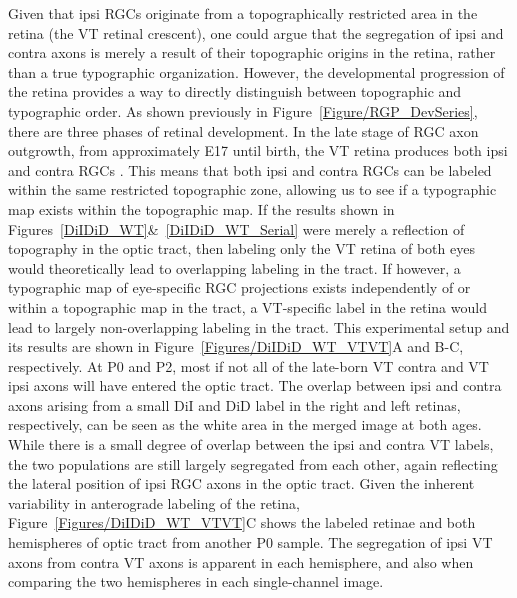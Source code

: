 Given that ipsi RGCs originate from a topographically restricted area in the retina (the VT retinal crescent), one could argue that the segregation of ipsi and contra axons is merely a result of their topographic origins in the retina, rather than a true typographic organization.
However, the developmental progression of the retina provides a way to directly distinguish between topographic and typographic order.
As shown previously in Figure~\ref{Figure/RGP_DevSeries}, there are three phases of retinal development.
In the late stage of RGC axon outgrowth, from approximately E17 until birth, the VT retina produces both ipsi and contra RGCs \cite{drager1985birth}.
This means that both ipsi and contra RGCs can be labeled within the same restricted topographic zone, allowing us to see if a typographic map exists within the topographic map.
If the results shown in Figures~\ref{DiIDiD_WT}\&~\ref{DiIDiD_WT_Serial} were merely a reflection of topography in the optic tract, then labeling only the VT retina of both eyes would theoretically lead to overlapping labeling in the tract.
If however, a typographic map of eye-specific RGC projections exists independently of or within a topographic map in the tract, a VT-specific label in the retina would lead to largely non-overlapping labeling in the tract.
This experimental setup and its results are shown in Figure~\ref{Figures/DiIDiD_WT_VTVT}A and B-C, respectively.
At P0 and P2, most if not all of the late-born VT contra and VT ipsi axons will have entered the optic tract.
The overlap between ipsi and contra axons arising from a small DiI and DiD label in the right and left retinas, respectively, can be seen as the white area in the merged image at both ages.
While there is a small degree of overlap between the ipsi and contra VT labels, the two populations are still largely segregated from each other, again reflecting the lateral position of ipsi RGC axons in the optic tract. 
Given the inherent variability in anterograde labeling of the retina, Figure~\ref{Figures/DiIDiD_WT_VTVT}C shows the labeled retinae and both hemispheres of optic tract from another P0 sample.
The segregation of ipsi VT axons from contra VT axons is apparent in each hemisphere, and also when comparing the two hemispheres in each single-channel image.

